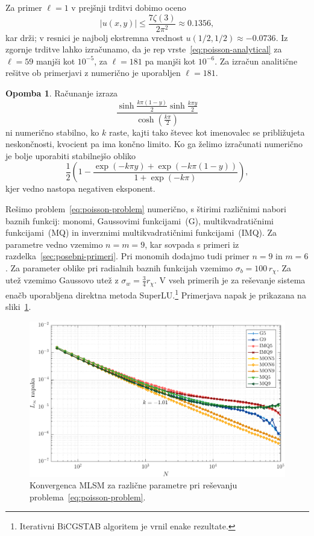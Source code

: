 \documentclass[12pt,a4paper,twoside]{article}
\theoremstyle{definition} %
\newtheorem{opomba}[definicija]{Opomba}
\theoremstyle{plain} %
\numberwithin{equation}{section}
\newlength{\iw}
\begin{document}
Za primer $\ell = 1$  v prejšnji trditvi dobimo oceno
\begin{equation}
   |u(x, y)| \leq \frac{7 \zeta(3)}{2 \pi^2} \approx 0.1356,
\end{equation}
kar drži; v resnici je najbolj ekstremna vrednost $u(1/2, 1/2) \approx -0.0736$.
Iz zgornje trditve lahko izračunamo, da je rep
vrste~\eqref{eq:poisson-analytical} za $\ell = 59$ manjši kot $10^{-5}$, za
$\ell = 181$ pa manjši kot $10^{-6}$. Za izračun analitične rešitve ob
primerjavi z numerično je uporabljen $\ell = 181$.
\begin{opomba}
  Računanje izraza
  \begin{equation}
   \frac{\sinh \frac{k \pi  (1-y)}{2} \sinh \frac{k \pi y}{2}}{\cosh(\frac{k\pi}{2})}
  \end{equation}
  ni numerično stabilno, ko $k$ raste, kajti tako števec kot imenovalec se približujeta
  neskončnosti, kvocient pa ima končno limito. Ko ga želimo izračunati numerično je bolje uporabiti
  stabilnejšo obliko
  \begin{equation}
    \frac12\left( 1 - \frac{\exp(-k\pi y) + \exp(-k\pi(1-y)) }{1 + \exp(-k\pi)}\right),
  \end{equation}
  kjer vedno nastopa negativen eksponent.
\end{opomba}

Rešimo problem~\eqref{eq:poisson-problem} numerično, s štirimi različnimi nabori baznih funkcij:
monomi, Gaussovimi funkcijami~(G), multikvadratičnimi funkcijami~(MQ) in inverznimi
multikvadratičnimi funkcijami~(IMQ).  Za parametre vedno vzemimo $n = m = 9$, kar sovpada s primeri
iz razdelka~\ref{sec:posebni-primeri}. Pri monomih dodajmo tudi primer $n = 9$ in $m = 6$. Za
parameter oblike pri radialnih baznih funkcijah vzemimo $\sigma_b = 100\, r_\chi$. Za utež vzemimo
Gaussovo utež z $\sigma_w = \frac34 r_\chi$. V vseh primerih je za reševanje sistema enačb
uporabljena direktna metoda SuperLU.\footnote{Iterativni BiCGSTAB algoritem je vrnil enake
rezultate.} Primerjava napak je prikazana na sliki~\ref{fig:poisson-square-convergence}.

\begin{figure}[h]
  \centering
  \includegraphics[width=\iw]{images/poisson_square_convergence.pdf}
  \caption[Konvergenca MLSM pri reševanju Poissonove enačbe]{Konvergenca MLSM
  za različne parametre pri reševanju problema~\eqref{eq:poisson-problem}.}
  \label{fig:poisson-square-convergence}
\end{figure}
\end{document}
